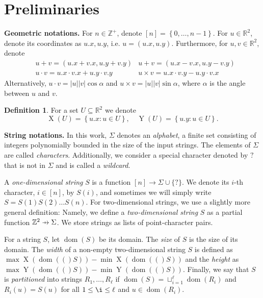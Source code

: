 \documentclass[11pt, letterpaper]{article}
\theoremstyle{plain}
\theoremstyle{definition}
\newtheorem{definition}{Definition}
\theoremstyle{remark}
\newcommand{\R}{\mathbb{R}}
\newcommand{\Z}{\mathbb{Z}}
\renewcommand{\phi}{\varphi}
\newcommand{\set}[1]{\left\lbrace #1 \right\rbrace}
\DeclareMathOperator*{\X}{X}
\DeclareMathOperator*{\Y}{Y}
\DeclareMathOperator*{\dom}{dom}
\DeclareMathOperator*{\chrome}{C}
\begin{document}
\section{Preliminaries}
\label{sec:preliminaries}
\newcommand{\x}[1]{#1.x}
\newcommand{\y}[1]{#1.y}
\newcommand{\h}[1]{\phi \times #1}
\newcommand{\s}[1]{\psi \times #1}

\textbf{Geometric notations.} For $n \in \Z^+$, denote $[n] = \set{0, \dots, n - 1}$. For $u \in \R^2$, denote its coordinates as $\x{u}, \y{u}$, i.e. $u = (\x{u}, \y{u})$. Furthermore, for $u, v \in \R^2$, denote 
\begin{align*}
&u + v = (\x{u}+\x{v}, \y{u} + \y{v})  & u + v = (\x{u}-\x{v}, \y{u}-\y{v})\\
&u \cdot v = \x{u} \cdot \x{v} + \y{u} \cdot \y{v}  & u \times v = \x{u} \cdot \y{v} - \y{u} \cdot \x{v}
\end{align*}
Alternatively, $u \cdot v = |u||v| \cos \alpha$ and $u \times v = |u||v| \sin \alpha$, where $\alpha$ is the angle between $u$ and $v$.

\begin{definition}
	For a set $U \subseteq \R^2$ we denote
	\[ \X(U) = \set{\x{u} : u \in U}, \quad \Y(U) = \set{\y{u} : u \in U}.\]
\end{definition}


\newcommand{\wild}{\texttt{?}}
\noindent \textbf{String notations.} In this work, $\Sigma$ denotes an \emph{alphabet}, a finite set consisting of integers polynomially bounded in the size of the input strings. The elements of $\Sigma$ are called \emph{characters}. Additionally, we consider a special character denoted by $\wild$ that is not in $\Sigma$ and is called a \emph{wildcard}.

\newcommand{\getchar}[1]{\chrome(#1)}
\newcommand{\pto}{\mathrel{\ooalign{\hfil$\mapstochar\mkern5mu$\hfil\cr$\to$\cr}}}
\renewcommand{\d}[1]{\dom(#1)}
\newcommand{\f}[1]{#1^\mathbf{f}}

A \emph{one-dimensional string} $S$ is a function $[n] \rightarrow \Sigma \cup \{\wild\}$. We denote its $i$-th character, $i \in [n]$, by $S(i)$, and sometimes we will simply write $S = S(1) S(2) \ldots S(n)$. For two-dimensional strings, we use a slightly more general definition: Namely, we define a \emph{two-dimensional string} $S$ as a partial function $\Z^2 \pto \Sigma$. We store strings as lists of point-character pairs. 

For a string $S$, let $\d{S}$ be its domain. The \emph{size} of $S$ is the size of its domain. The \emph{width} of a non-empty two-dimensional string $S$ is defined as $\max \X(\d(S)) - \min \X(\d(S))$ and the \emph{height} as $\max \Y(\d(S)) - \min \Y(\d(S))$. Finally, we say that $S$ is \emph{partitioned} into strings $R_1, \dots, R_\ell$ if $\d{S} = \sqcup_{i = 1}^\ell \d{R_i}$ and $R_i(u) = S(u)$ for all $1 \le \i \le \ell$ and $u \in \d{R_i}$.
\end{document}
